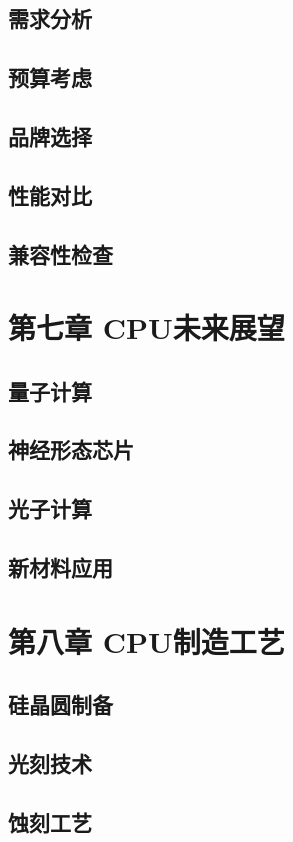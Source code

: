 \documentclass[12pt,UTF8]{ctexbook}
\begin{document}
\section{需求分析}
\section{预算考虑}
\section{品牌选择}
\section{性能对比}
\section{兼容性检查}

\chapter{第七章 CPU未来展望}

\section{量子计算}
\section{神经形态芯片}
\section{光子计算}
\section{新材料应用}

\chapter{第八章 CPU制造工艺}

\section{硅晶圆制备}
\section{光刻技术}
\section{蚀刻工艺}
\end{document}
